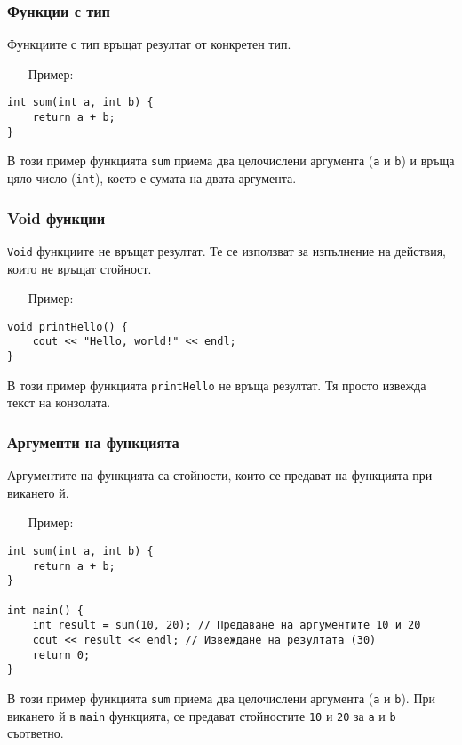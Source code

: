 \documentclass[oneside]{book}
\newcommand*{\code}[1]{\texttt{#1}}
\begin{document}
\subsubsection{Функции с тип}
Функциите с тип връщат резултат от конкретен тип.

\begin{itemize}\item[Пример:]\end{itemize}
\begin{mdframed}\begin{lstlisting}
int sum(int a, int b) {
    return a + b;
}
\end{lstlisting}\end{mdframed}
В този пример функцията \code{sum} приема два целочислени аргумента (\code{a} и \code{b}) и връща цяло число (\code{int}), което е сумата на двата аргумента.

\subsubsection{Void функции}
\code{Void} функциите не връщат резултат. Те се използват за изпълнение на действия, които не връщат стойност.

\begin{itemize}\item[Пример:]\end{itemize}
\begin{mdframed}\begin{lstlisting}
void printHello() {
    cout << "Hello, world!" << endl;
}
\end{lstlisting}\end{mdframed}
В този пример функцията \code{printHello} не връща резултат. Тя просто извежда текст на конзолата.

\subsubsection{Аргументи на функцията}
Аргументите на функцията са стойности, които се предават на функцията при викането й.
\pagebreak
\begin{itemize}\item[Пример:]\end{itemize}
\begin{mdframed}\begin{lstlisting}
int sum(int a, int b) {
    return a + b;
}

int main() {
    int result = sum(10, 20); // Предаване на аргументите 10 и 20
    cout << result << endl; // Извеждане на резултата (30)
    return 0;
}
\end{lstlisting}\end{mdframed}
В този пример функцията \code{sum} приема два целочислени аргумента (\code{a} и \code{b}). При викането й в \code{main} функцията, се предават стойностите \code{10} и \code{20} за \code{a} и \code{b} съответно.
\end{document}
